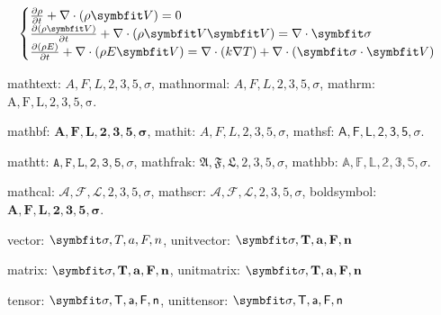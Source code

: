 {\begin{equation} \label{eq:appedns2}
    \begin{cases}
        \frac{\partial \rho}{\partial t} + \nabla\cdot(\rho\Vector{V}) = 0\\
        \frac{\partial (\rho\Vector{V})}{\partial t} + \nabla\cdot(\rho\Vector{V}\Vector{V}) = \nabla\cdot\Tensor{\sigma}\\
        \frac{\partial (\rho E)}{\partial t} + \nabla\cdot(\rho E\Vector{V}) = \nabla\cdot(k\nabla T) + \nabla\cdot(\Tensor{\sigma}\cdot\Vector{V})
    \end{cases}
\end{equation}


mathtext: $A,F,L,2,3,5,\sigma$, mathnormal: $A,F,L,2,3,5,\sigma$, mathrm: $\mathrm{A,F,L,2,3,5,\sigma}$.

mathbf: $\mathbf{A,F,L,2,3,5,\sigma}$, mathit: $\mathit{A,F,L,2,3,5,\sigma}$, mathsf: $\mathsf{A,F,L,2,3,5,\sigma}$.

mathtt: $\mathtt{A,F,L,2,3,5,\sigma}$, mathfrak: $\mathfrak{A,F,L,2,3,5,\sigma}$, mathbb: $\mathbb{A,F,L,2,3,5,\sigma}$.

mathcal: $\mathcal{A,F,L,2,3,5,\sigma}$, mathscr: $\mathscr{A,F,L,2,3,5,\sigma}$, boldsymbol: $\boldsymbol{A,F,L,2,3,5,\sigma}$.

vector: $\Vector{\sigma, T, a, F, n}$, unitvector: $\unitVector{\sigma, T, a, F, n}$

matrix: $\Matrix{\sigma, T, a, F, n}$, unitmatrix: $\unitMatrix{\sigma, T, a, F, n}$

tensor: $\Tensor{\sigma, T, a, F, n}$, unittensor: $\unitTensor{\sigma, T, a, F, n}$ 


\thispagestyle{appendixheader}
}

